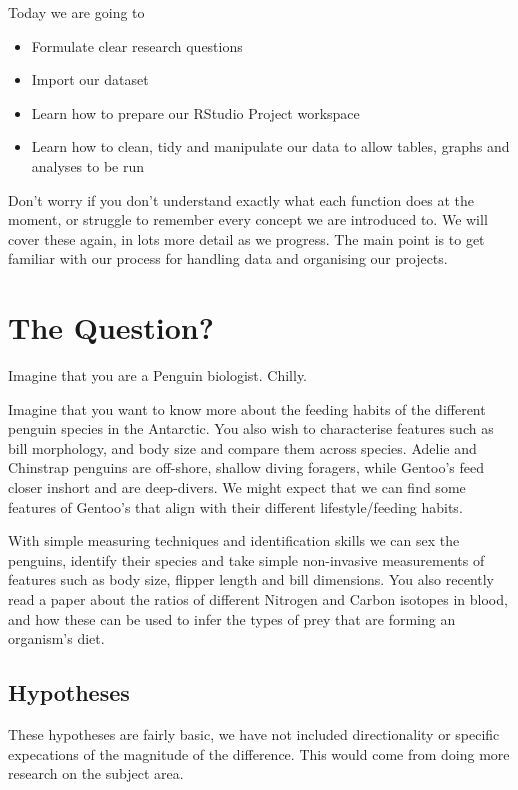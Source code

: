 \documentclass[
]{book}
\begin{document}
Today we are going to

\begin{itemize}
\item
  Formulate clear research questions
\item
  Import our dataset
\item
  Learn how to prepare our RStudio Project workspace
\item
  Learn how to clean, tidy and manipulate our data to allow tables, graphs and analyses to be run
\end{itemize}

Don't worry if you don't understand exactly what each function does at the moment, or struggle to remember every concept we are introduced to. We will cover these again, in lots more detail as we progress. The main point is to get familiar with our process for handling data and organising our projects.

\hypertarget{the-question}{%
\section{The Question?}\label{the-question}}

Imagine that you are a Penguin biologist. Chilly.

Imagine that you want to know more about the feeding habits of the different penguin species in the Antarctic. You also wish to characterise features such as bill morphology, and body size and compare them across species. Adelie and Chinstrap penguins are off-shore, shallow diving foragers, while Gentoo's feed closer inshort and are deep-divers. We might expect that we can find some features of Gentoo's that align with their different lifestyle/feeding habits.

With simple measuring techniques and identification skills we can sex the penguins, identify their species and take simple non-invasive measurements of features such as body size, flipper length and bill dimensions. You also recently read a paper about the ratios of different Nitrogen and Carbon isotopes in blood, and how these can be used to infer the types of prey that are forming an organism's diet.

\hypertarget{hypotheses}{%
\subsection{Hypotheses}\label{hypotheses}}

These hypotheses are fairly basic, we have not included directionality or specific expecations of the magnitude of the difference. This would come from doing more research on the subject area.
\end{document}
